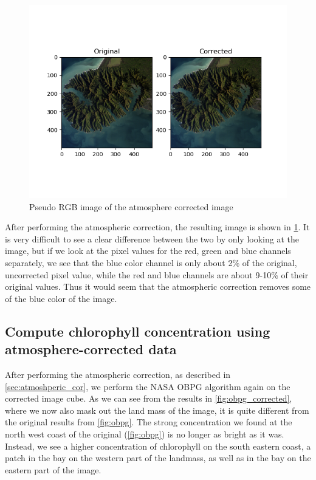 \begin{figure}
    \centering
    \includegraphics[width=\textwidth]{../fig/pseudo_rgb_corrected.png}
    \caption{Pseudo RGB image of the atmosphere corrected image}
    \label{fig:RGB_corrected}
\end{figure}

After performing the atmospheric correction, the resulting image is shown in 
\cref{fig:RGB_corrected}. It is very difficult to see a clear difference between 
the two by only looking at the image, but if we look at the pixel values for the red, 
green and blue channels separately, we see that the blue color channel is only about 2\% 
of the original, uncorrected pixel value, while the red and blue channels are about 9-10\% 
of their original values. Thus it would seem that the atmospheric correction removes some of 
the blue color of the image. 

\subsection{Compute chlorophyll concentration using atmosphere-corrected data}

After performing the atmospheric correction, as described in \cref{sec:atmoshperic_cor}, 
we perform the NASA OBPG algorithm again on the corrected image cube. As we can 
see from the results in \cref{fig:obpg_corrected}, where we now also mask out the 
land mass of the image, it is quite different from the 
original results from \cref{fig:obpg}. The strong concentration we found at the north 
west coast of the original (\cref{fig:obpg}) is no longer as bright as it was.
Instead, we see a higher concentration of chlorophyll on the south eastern coast, 
a patch in the bay on the western part of the landmass, as well as in the bay on the 
eastern part of the image. 


